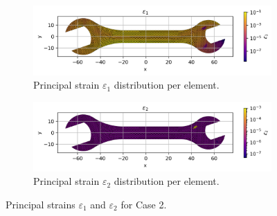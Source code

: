 \begin{figure}[H]
    \centering
    \begin{subfigure}[t]{0.49\textwidth}
      \centering
      \includegraphics[width=\textwidth]{GRAFICOS/Case a - epsilon_1_per_element.png}
      \caption{Principal strain $\varepsilon_1$ distribution per element.}
      \label{fig:epsilon_1_a}
    \end{subfigure}
    \hfill
    \begin{subfigure}[t]{0.49\textwidth}
      \centering
      \includegraphics[width=\textwidth]{GRAFICOS/Case a - epsilon_2_per_element.png}
      \caption{Principal strain $\varepsilon_2$ distribution per element.}
      \label{fig:epsilon_2_a}
    \end{subfigure}
    \caption{Principal strains $\varepsilon_1$ and $\varepsilon_2$ for Case 2.}
    \label{fig:principal_strains_a}
\end{figure}

